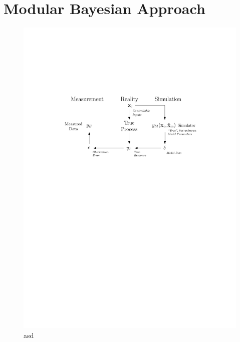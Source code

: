 \section{Modular Bayesian Approach}\label{sec:bc_modular_bayes}

\lipsum[10]
\begin{figure}[bth]	
	\centering
	\includegraphics[width=1.0\textwidth]{../figures/chapter5/figures/HMErrorModel}
	\caption[ad]{asd}
	\label{fig:ch5_hm_error_model}
\end{figure}
